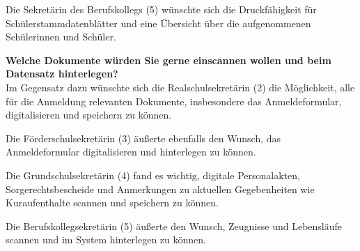Die Sekretärin des Berufskollegs (5) wünschte sich die Druckfähigkeit für Schülerstammdatenblätter und eine Übersicht über die aufgenommenen Schülerinnen und Schüler.

\textbf{Welche Dokumente würden Sie gerne einscannen wollen und beim Datensatz hinterlegen?}\\
Im Gegensatz dazu wünschte sich die Realschulsekretärin (2) die Möglichkeit, alle für die Anmeldung relevanten Dokumente, insbesondere das Anmeldeformular, digitalisieren und speichern zu können.

Die Förderschulsekretärin (3) äußerte ebenfalls den Wunsch, das Anmeldeformular digitalisieren und hinterlegen zu können.

Die Grundschulsekretärin (4) fand es wichtig, digitale Personalakten, Sorgerechtsbescheide und Anmerkungen zu aktuellen Gegebenheiten wie Kuraufenthalte scannen und speichern zu können.

Die Berufskollegsekretärin (5) äußerte den Wunsch, Zeugnisse und Lebensläufe scannen und im System hinterlegen zu können.